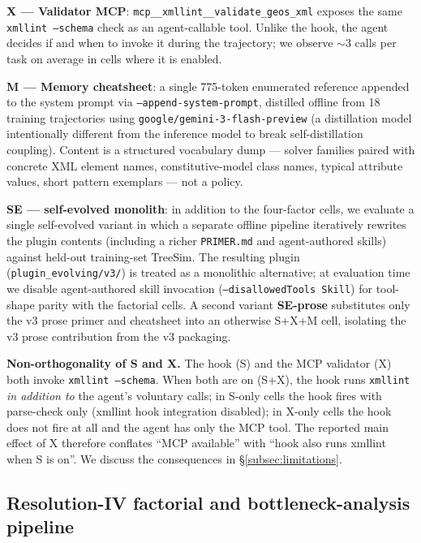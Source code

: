 \documentclass{article}
\begin{document}
\textbf{X --- Validator MCP}: \texttt{mcp\_\_xmllint\_\_validate\_geos\_xml} exposes the same \texttt{xmllint --schema} check as an agent-callable tool. Unlike the hook, the agent decides if and when to invoke it during the trajectory; we observe ${\sim}3$ calls per task on average in cells where it is enabled.

\textbf{M --- Memory cheatsheet}: a single 775-token enumerated reference appended to the system prompt via \texttt{--append-system-prompt}, distilled offline from 18 training trajectories using \texttt{google/gemini-3-flash-preview} (a distillation model intentionally different from the inference model to break self-distillation coupling). Content is a structured vocabulary dump --- solver families paired with concrete XML element names, constitutive-model class names, typical attribute values, short pattern exemplars --- not a policy.

\textbf{SE --- self-evolved monolith}: in addition to the four-factor cells, we evaluate a single self-evolved variant in which a separate offline pipeline iteratively rewrites the plugin contents (including a richer \texttt{PRIMER.md} and agent-authored skills) against held-out training-set TreeSim. The resulting plugin (\texttt{plugin\_evolving/v3/}) is treated as a monolithic alternative; at evaluation time we disable agent-authored skill invocation (\texttt{--disallowedTools Skill}) for tool-shape parity with the factorial cells. A second variant \textbf{SE-prose} substitutes only the v3 prose primer and cheatsheet into an otherwise S+X+M cell, isolating the v3 prose contribution from the v3 packaging.

\textbf{Non-orthogonality of S and X.} The hook (S) and the MCP validator (X) both invoke \texttt{xmllint --schema}. When both are on (S+X), the hook runs \texttt{xmllint} \emph{in addition to} the agent's voluntary calls; in S-only cells the hook fires with parse-check only (xmllint hook integration disabled); in X-only cells the hook does not fire at all and the agent has only the MCP tool. The reported main effect of X therefore conflates ``MCP available'' with ``hook also runs xmllint when S is on''. We discuss the consequences in \S\ref{subsec:limitations}.

\subsection{Resolution-IV factorial and bottleneck-analysis pipeline}
\label{subsec:cells}
\end{document}
